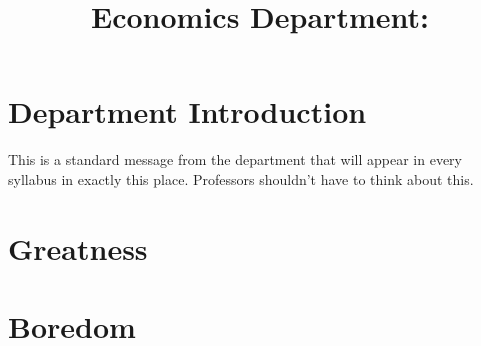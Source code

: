 \documentclass[12pt]{article}
\title{Economics Department: \BLOCK{block title}\BLOCK{endblock}}
\author{\vspace{-5ex}}
\date{\vspace{-5ex}}
\begin{document}
\maketitle

\section{Department Introduction}
This is a standard message from the department
that will appear in every syllabus in exactly this place.
Professors shouldn't have to think about this.

\section{Greatness}

\section{Boredom}
\end{document}

